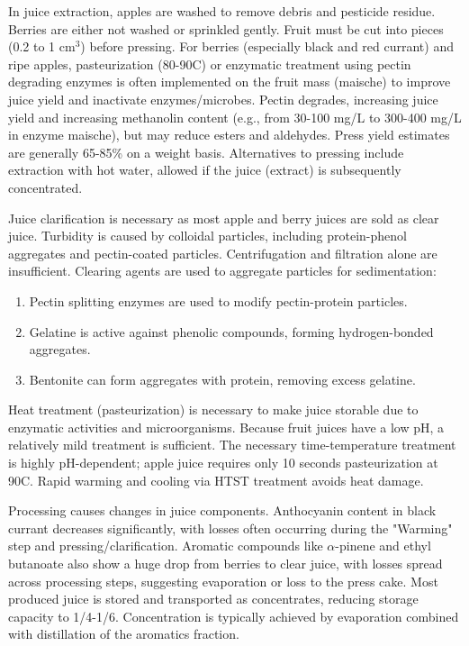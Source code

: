 \vspace{0.5em}
In juice extraction, apples are washed to remove debris and pesticide residue. Berries are either not washed or sprinkled gently. Fruit must be cut into pieces (0.2 to 1 cm$^3$) before pressing. For berries (especially black and red currant) and ripe apples, pasteurization (80-90\textdegree C) or enzymatic treatment using pectin degrading enzymes is often implemented on the fruit mass (maische) to improve juice yield and inactivate enzymes/microbes. Pectin degrades, increasing juice yield and increasing methanolin content (e.g., from 30-100 mg/L to 300-400 mg/L in enzyme maische), but may reduce esters and aldehydes. Press yield estimates are generally 65-85\% on a weight basis. Alternatives to pressing include extraction with hot water, allowed if the juice (extract) is subsequently concentrated.

\vspace{0.5em}
Juice clarification is necessary as most apple and berry juices are sold as clear juice. Turbidity is caused by colloidal particles, including protein-phenol aggregates and pectin-coated particles. Centrifugation and filtration alone are insufficient. Clearing agents are used to aggregate particles for sedimentation: 

\begin{enumerate} 
    \item Pectin splitting enzymes are used to modify pectin-protein particles. 
    \item Gelatine is active against phenolic compounds, forming hydrogen-bonded aggregates. 
    \item Bentonite can form aggregates with protein, removing excess gelatine. 
\end{enumerate}

\vspace{0.5em}
Heat treatment (pasteurization) is necessary to make juice storable due to enzymatic activities and microorganisms. Because fruit juices have a low pH, a relatively mild treatment is sufficient. The necessary time-temperature treatment is highly pH-dependent; apple juice requires only 10 seconds pasteurization at 90\textdegree C. Rapid warming and cooling via HTST treatment avoids heat damage.

\vspace{0.5em}
Processing causes changes in juice components. Anthocyanin content in black currant decreases significantly, with losses often occurring during the "Warming" step and pressing/clarification. Aromatic compounds like $\alpha$-pinene and ethyl butanoate also show a huge drop from berries to clear juice, with losses spread across processing steps, suggesting evaporation or loss to the press cake.
Most produced juice is stored and transported as concentrates, reducing storage capacity to 1/4-1/6. Concentration is typically achieved by evaporation combined with distillation of the aromatics fraction.


